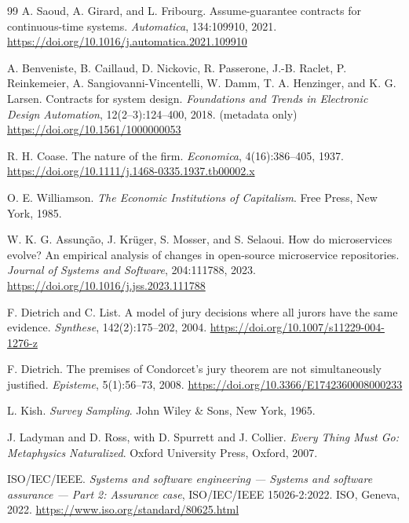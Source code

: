 \begin{thebibliography}{99}
A. Saoud, A. Girard, and L. Fribourg.
\newblock Assume-guarantee contracts for continuous-time systems.
\newblock \emph{Automatica}, 134:109910, 2021.
\newblock \url{https://doi.org/10.1016/j.automatica.2021.109910}

A. Benveniste, B. Caillaud, D. Nickovic, R. Passerone, J.-B. Raclet, P. Reinkemeier,
A. Sangiovanni-Vincentelli, W. Damm, T. A. Henzinger, and K. G. Larsen.
\newblock Contracts for system design.
\newblock \emph{Foundations and Trends in Electronic Design Automation},
12(2--3):124--400, 2018. (metadata only)
\newblock \url{https://doi.org/10.1561/1000000053}

R. H. Coase.
\newblock The nature of the firm.
\newblock \emph{Economica}, 4(16):386--405, 1937.
\newblock \url{https://doi.org/10.1111/j.1468-0335.1937.tb00002.x}

O. E. Williamson.
\newblock \emph{The Economic Institutions of Capitalism}.
\newblock Free Press, New York, 1985.

W. K. G. Assun{\c c}{\~a}o, J. Kr{\"u}ger, S. Mosser, and S. Selaoui.
\newblock How do microservices evolve? An empirical analysis of changes in
open-source microservice repositories.
\newblock \emph{Journal of Systems and Software}, 204:111788, 2023.
\newblock \url{https://doi.org/10.1016/j.jss.2023.111788}

F. Dietrich and C. List.
\newblock A model of jury decisions where all jurors have the same evidence.
\newblock \emph{Synthese}, 142(2):175--202, 2004.
\newblock \url{https://doi.org/10.1007/s11229-004-1276-z}

F. Dietrich.
\newblock The premises of Condorcet's jury theorem are not simultaneously
justified.
\newblock \emph{Episteme}, 5(1):56--73, 2008.
\newblock \url{https://doi.org/10.3366/E1742360008000233}

L. Kish.
\newblock \emph{Survey Sampling}.
\newblock John Wiley \& Sons, New York, 1965.

J. Ladyman and D. Ross, with D. Spurrett and J. Collier.
\newblock \emph{Every Thing Must Go: Metaphysics Naturalized}.
\newblock Oxford University Press, Oxford, 2007.

ISO/IEC/IEEE.
\newblock \emph{Systems and software engineering --- Systems and software assurance
--- Part 2: Assurance case}, ISO/IEC/IEEE 15026-2:2022.
\newblock ISO, Geneva, 2022.
\newblock \url{https://www.iso.org/standard/80625.html}


\end{thebibliography}
